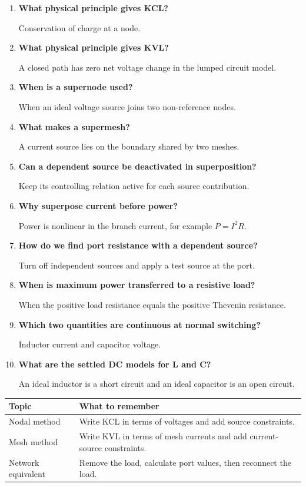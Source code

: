 \documentclass[12pt,a4paper]{article}
\newcommand{\Q}[1]{\textbf{#1}\par\noindent\ignorespaces}
\begin{document}
\begin{tcolorbox}[exambox, title={Frequently Asked / Viva Questions}]
\begin{enumerate}[topsep=0pt, label=\textbf{Q\arabic*.}, itemsep=5pt]
  \item \Q{What physical principle gives KCL?} Conservation of charge at a node.
  \item \Q{What physical principle gives KVL?} A closed path has zero net voltage change in the lumped circuit model.
  \item \Q{When is a supernode used?} When an ideal voltage source joins two non-reference nodes.
  \item \Q{What makes a supermesh?} A current source lies on the boundary shared by two meshes.
  \item \Q{Can a dependent source be deactivated in superposition?} Keep its controlling relation active for each source contribution.
  \item \Q{Why superpose current before power?} Power is nonlinear in the branch current, for example $P=I^2R$.
  \item \Q{How do we find port resistance with a dependent source?} Turn off independent sources and apply a test source at the port.
  \item \Q{When is maximum power transferred to a resistive load?} When the positive load resistance equals the positive Thevenin resistance.
  \item \Q{Which two quantities are continuous at normal switching?} Inductor current and capacitor voltage.
  \item \Q{What are the settled DC models for L and C?} An ideal inductor is a short circuit and an ideal capacitor is an open circuit.
\end{enumerate}
\end{tcolorbox}

\begin{tcolorbox}[tikzbox, title={Summary Reference}]
\begin{tabularx}{\linewidth}{|B{4.0cm}|Y|}\hline
Topic & \textbf{What to remember} \\ \hline
Nodal method & Write KCL in terms of voltages and add source constraints. \\ \hline
Mesh method & Write KVL in terms of mesh currents and add current-source constraints. \\ \hline
Network equivalent & Remove the load, calculate port values, then reconnect the load. \\ \hline
\end{tabularx}
\end{tcolorbox}
\end{document}
